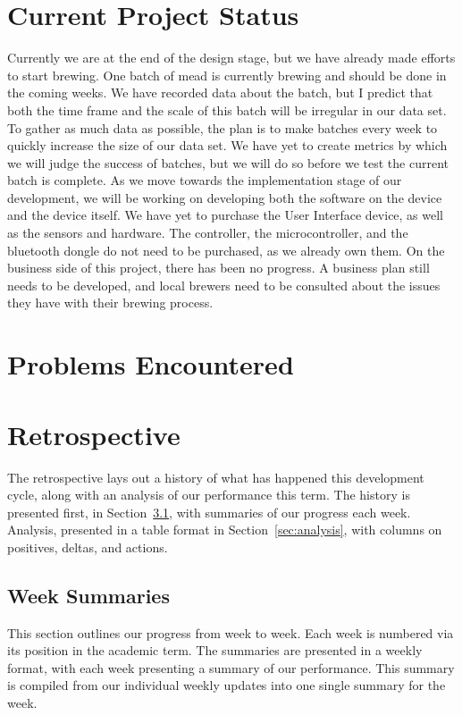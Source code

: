 \documentclass[draftclsnofoot,onecolumn,letterpaper,10pt]{IEEEtran}
\begin{document}
\section{Current Project Status}%
Currently we are at the end of the design stage, but we have already made efforts to start brewing.
One batch of mead is currently brewing and should be done in the coming weeks.
We have recorded data about the batch, but I predict that both the time frame and the scale of this batch will be irregular in our data set.
To gather as much data as possible, the plan is to make batches every week to quickly increase the size of our data set.
We have yet to create metrics by which we will judge the success of batches, but we will do so before we test the current batch is complete.
As we move towards the implementation stage of our development, we will be working on developing both the software on the device and the device itself.
We have yet to purchase the User Interface device, as well as the sensors and hardware.
The controller, the microcontroller, and the bluetooth dongle do not need to be purchased, as we already own them.
On the business side of this project, there has been no progress.
A business plan still needs to be developed, and local brewers need to be consulted about the issues they have with their brewing process.


\section{Problems Encountered}%

\section{Retrospective}
The retrospective lays out a history of what has happened this development cycle, along with an analysis of our performance this term.
The history is presented first, in Section~\ref{sec:weekSummaries}, with summaries of our progress each week.
Analysis, presented in a table format in Section~\ref{sec:analysis}, with columns on positives, deltas, and actions.

\subsection{Week Summaries}\label{sec:weekSummaries}
This section outlines our progress from week to week.
Each week is numbered via its position in the academic term.
The summaries are presented in a weekly format, with each week presenting a summary of our performance.
This summary is compiled from our individual weekly updates into one single summary for the week. %
\end{document}
